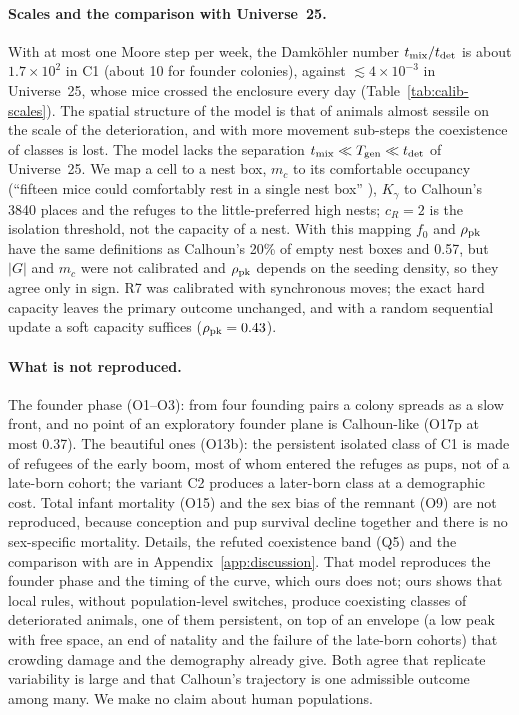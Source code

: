 \paragraph{Scales and the comparison with Universe~25.}
With at most one Moore step per week, the Damköhler number $t_{\rm mix}/t_{\rm det}$ is about $1.7\times10^2$ in
\textsf{C1} (about 10 for founder colonies), against $\lesssim4\times10^{-3}$ in Universe~25, whose mice crossed the
enclosure every day (Table~\ref{tab:calib-scales}). The spatial structure of the model is that of animals almost
sessile on the scale of the deterioration, and with more movement sub-steps the coexistence of classes is lost. The
model lacks the separation $t_{\rm mix}\ll T_{\rm gen}\ll t_{\rm det}$ of Universe~25. We map a cell to a nest box, $m_c$ to its comfortable occupancy (``fifteen
mice could comfortably rest in a single nest box'' \cite{Calhoun1973}), $K_\gamma$ to Calhoun's 3840 places and the
refuges to the little-preferred high nests; $c_R=2$ is the isolation threshold, not the capacity of a nest. With this
mapping $f_0$ and $\rho_{\rm pk}$ have the same definitions as Calhoun's 20\% of empty nest boxes and 0.57, but $|G|$
and $m_c$ were not calibrated and $\rho_{\rm pk}$ depends on the seeding density, so they agree only in sign. R7 was
calibrated with synchronous moves; the exact hard capacity leaves the primary outcome unchanged, and with a random
sequential update a soft capacity suffices ($\rho_{\rm pk}=0.43$).

\paragraph{What is not reproduced.}
The founder phase (O1--O3): from four founding pairs a colony spreads as a slow front, and no point of an exploratory
founder plane is Calhoun-like (O17p at most 0.37). The beautiful ones (O13b): the persistent isolated class of
\textsf{C1} is made of refugees of the early boom, most of whom entered the refuges as pups, not of a late-born
cohort; the variant \textsf{C2} produces a later-born class at a demographic cost. Total infant mortality (O15) and the
sex bias of the remnant (O9) are not reproduced, because conception and pup survival decline together and there is no
sex-specific mortality. Details, the refuted coexistence band (Q5) and the comparison with
\cite{GwizdallaDus2026} are in Appendix~\ref{app:discussion}. That model reproduces the founder phase and the timing
of the curve, which ours does not; ours shows that local rules, without population-level switches, produce
coexisting classes of deteriorated animals, one of them persistent, on top of an envelope (a low peak with free
space, an end of natality and the failure of the late-born cohorts) that crowding damage and the demography already
give. Both agree that replicate variability is large and that Calhoun's trajectory is one admissible outcome among
many. We make no claim about human populations.

